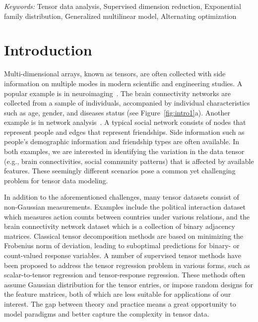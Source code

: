 \documentclass[12pt]{article}
\theoremstyle{definition}
\theoremstyle{definition}
\begin{document}
\noindent%
{\it Keywords:}  Tensor data analysis, Supervised dimension reduction, Exponential family distribution, Generalized multilinear model, Alternating optimization
\vfill

\newpage
{} %
\section{Introduction}
\label{sec:intro}
Multi-dimensional arrays, known as tensors, are often collected with side information on multiple modes in modern scientific and engineering studies. A popular example is in neuroimaging~\citep{zhou2013tensor}. The brain connectivity networks are collected from a sample of individuals, accompanied by individual characteristics such as age, gender, and diseases status (see Figure~\ref{fig:intro1}a). Another example is in network analysis~\citep{pmlr-v108-berthet20a,hoff2005bilinear}. A typical social network consists of nodes that represent people and edges that represent  friendships. Side information such as people’s demographic information and friendship types are often available. In both examples, we are interested in identifying the variation in the data tensor (e.g., brain connectivities, social community patterns) that is affected by available features. These seemingly different scenarios pose a common yet challenging problem for tensor data modeling. 

In addition to the aforementioned challenges, many tensor datasets consist of non-Gaussian measurements. Examples include the political interaction dataset \citep{nickel2011three} which measures action counts between countries under various relations, and the brain connectivity network dataset \citep{zhou2013tensor,wang2020learning} which is a collection of binary adjacency matrices. Classical tensor decomposition methods are based on minimizing the Frobenius norm of deviation, leading to suboptimal predictions for binary- or count-valued response variables. A number of supervised tensor methods have been proposed \citep{lock2018supervised,li2017parsimonious,sun2017store,hao2019sparse,raskutti2019convex} to address the tensor regression problem in various forms, such as scalar-to-tensor regression and tensor-response regression. These methods often assume Gaussian distribution for the tensor entries, or impose random designs for the feature matrices, both of which are less suitable for applications of our interest. The gap between theory and practice means a great opportunity to model paradigms and better capture the complexity in tensor data. 
\end{document}

